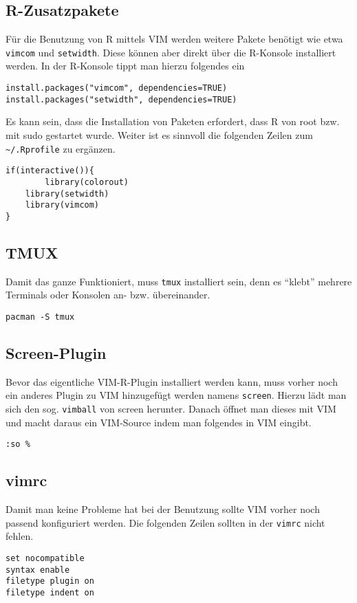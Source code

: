 \documentclass[a4paper,
               10pt,
               fleqn]{article}
\begin{document}
\subsection{R-Zusatzpakete}
Für die Benutzung von R mittels VIM werden weitere Pakete benötigt wie etwa
\verb!vimcom! und \verb!setwidth!.
Diese können aber direkt über die R-Konsole installiert werden.
In der R-Konsole tippt man hierzu folgendes ein
\begin{lstlisting}
install.packages("vimcom", dependencies=TRUE)
install.packages("setwidth", dependencies=TRUE)
\end{lstlisting}
Es kann sein, dass die Installation von Paketen erfordert, dass R von root
bzw. mit sudo gestartet wurde.
Weiter ist es sinnvoll die folgenden Zeilen zum \verb!~/.Rprofile! zu ergänzen.
\begin{lstlisting}
if(interactive()){
        library(colorout)
	library(setwidth)
	library(vimcom)
}
\end{lstlisting}

\subsection{TMUX}
Damit das ganze Funktioniert, muss \verb!tmux! installiert sein, denn es
``klebt'' mehrere Terminals oder Konsolen an- bzw. übereinander.
\begin{lstlisting}
pacman -S tmux
\end{lstlisting}

\subsection{Screen-Plugin}
Bevor das eigentliche VIM-R-Plugin installiert werden kann, muss vorher noch
ein anderes Plugin zu VIM hinzugefügt werden namens \verb!screen!. 
Hierzu lädt man sich den sog. \verb!vimball! von screen herunter.
Danach öffnet man dieses mit VIM und macht daraus ein VIM-Source indem man
folgendes in VIM eingibt.
\begin{lstlisting}
:so %
\end{lstlisting}

\subsection{vimrc}
Damit man keine Probleme hat bei der Benutzung sollte VIM vorher noch 
passend konfiguriert werden. Die folgenden Zeilen sollten in der
\verb!vimrc! nicht fehlen.
\begin{lstlisting}
set nocompatible
syntax enable
filetype plugin on
filetype indent on
\end{lstlisting}
\end{document}

